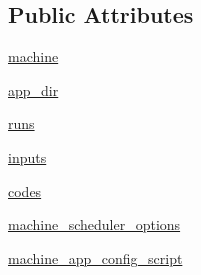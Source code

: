 \subsection*{Public Attributes}
\begin{DoxyCompactItemize}
\item 
\hyperlink{classcodar_1_1cheetah_1_1model_1_1_campaign_a22d066017db80781e962ce372c32bf79}{machine}
\item 
\hyperlink{classcodar_1_1cheetah_1_1model_1_1_campaign_a0d0c15af5ad8c345542eeba939f15ef6}{app\+\_\+dir}
\item 
\hyperlink{classcodar_1_1cheetah_1_1model_1_1_campaign_ade0d3ba84103ebb3c91252576b3c18f1}{runs}
\item 
\hyperlink{classcodar_1_1cheetah_1_1model_1_1_campaign_a91554c0c4fc9689aea73d47f9b3c991c}{inputs}
\item 
\hyperlink{classcodar_1_1cheetah_1_1model_1_1_campaign_ab7a9563b8cc62768d19be6a2f4c7772c}{codes}
\item 
\hyperlink{classcodar_1_1cheetah_1_1model_1_1_campaign_a1c6c7a99c27b5ed80721cb4a2328446f}{machine\+\_\+scheduler\+\_\+options}
\item 
\hyperlink{classcodar_1_1cheetah_1_1model_1_1_campaign_aa7fbc79a48f35a16bb12db12bef77a20}{machine\+\_\+app\+\_\+config\+\_\+script}
\end{DoxyCompactItemize}
